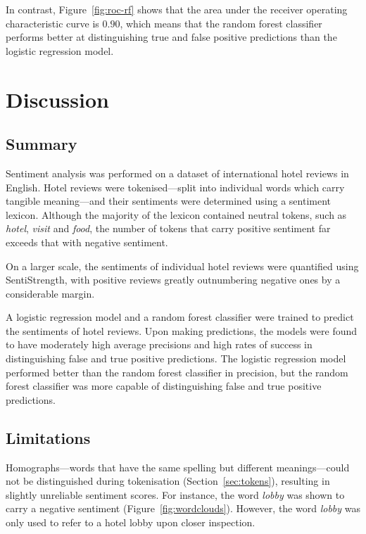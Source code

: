 \documentclass[12pt, a4paper]{pancake-article}
\begin{document}
In contrast, Figure~\ref{fig:roc-rf} shows that the area under
the receiver operating characteristic curve is $0.90$, which means
that the random forest classifier performs better at distinguishing
true and false positive predictions than the logistic regression model.

\section{Discussion}

\subsection{Summary}

Sentiment analysis was performed on a dataset of international hotel reviews
in English. Hotel reviews were tokenised---split into individual words which
carry tangible meaning---and their sentiments were determined using a sentiment
lexicon. Although the majority of the lexicon contained neutral tokens,
such as \textit{hotel}, \textit{visit} and \textit{food}, the number of tokens
that carry positive sentiment far exceeds that with negative sentiment.

On a larger scale, the sentiments of individual hotel reviews were quantified
using SentiStrength, with positive reviews greatly outnumbering negative ones
by a considerable margin.

A logistic regression model and a random forest classifier were trained to
predict the sentiments of hotel reviews. Upon making predictions, the models
were found to have moderately high average precisions and high rates of
success in distinguishing false and true positive predictions. The logistic
regression model performed better than the random forest classifier in precision,
but the random forest classifier was more capable of distinguishing false and true
positive predictions.

\subsection{Limitations}
Homographs---words that have the same spelling but different meanings---could
not be distinguished during tokenisation (Section~\ref{sec:tokens}), resulting in
slightly unreliable sentiment scores. For instance, the word \textit{lobby} was shown to
carry a negative sentiment (Figure~\ref{fig:wordclouds}). However, the word \textit{lobby}
was only used to refer to a hotel lobby upon closer inspection.
\end{document}

